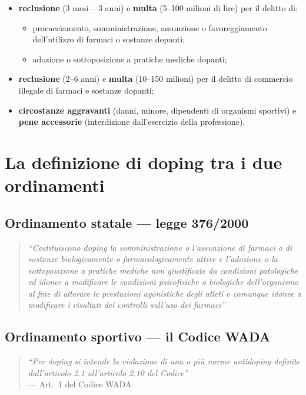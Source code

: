 \begin{itemize}
  \item \textbf{reclusione} (3 mesi -- 3 anni) e \textbf{multa} (5--100 milioni di lire) per il
    delitto di:
    \begin{itemize}
      \item procacciamento, somministrazione, assunzione o favoreggiamento dell'utilizzo di
        farmaci o sostanze dopanti;
      \item adozione o sottoposizione a pratiche mediche dopanti;
    \end{itemize}
  \item \textbf{reclusione} (2--6 anni) e \textbf{multa} (10--150 milioni) per il delitto di
    commercio illegale di farmaci e sostanze dopanti;
  \item \textbf{circostanze aggravanti} (danni, minore, dipendenti di organismi sportivi) e
    \textbf{pene accessorie} (interdizione dall'esercizio della professione).
\end{itemize}

\section{La definizione di doping tra i due ordinamenti}

\subsection{Ordinamento statale --- legge 376/2000}

\begin{quote}
\textit{``Costituiscono doping la somministrazione o l'assunzione di farmaci o di sostanze
biologicamente o farmacologicamente attive e l'adozione o la sottoposizione a pratiche mediche
non giustificate da condizioni patologiche ed idonee a modificare le condizioni psicofisiche o
biologiche dell'organismo al fine di alterare le prestazioni agonistiche degli atleti e comunque
idonee a modificare i risultati dei controlli sull'uso dei farmaci''}
\end{quote}

\subsection{Ordinamento sportivo --- il Codice WADA}

\begin{quote}
\textit{``Per doping si intende la violazione di una o più norme antidoping definite
dall'articolo 2.1 all'articolo 2.10 del Codice''}\\
\hfill --- Art.\ 1 del Codice WADA
\end{quote}


